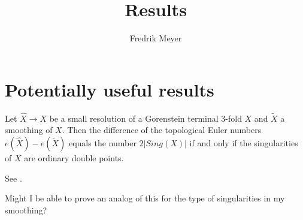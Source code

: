 \documentclass[11pt, english]{article}
\begin{document}
\title{Results}
\author{Fredrik Meyer}
\maketitle 

\section{Potentially useful results}

\begin{prop}
Let $\widehat X \to X$ be a small resolution of a Gorenstein terminal 3-fold $X$ and $\widetilde X$ a smoothing of $X$. Then the difference of the topological Euler numbers $e(\widehat X) - e(\widetilde X)$ equals the number $2\lvert Sing(X) \rvert$ if and only if the singularities of $X$ are ordinary double points.
\end{prop}
See \cite{wang_connectedness}.

Might I be able to prove an analog of this for the type of singularities in my smoothing?



\end{document}
